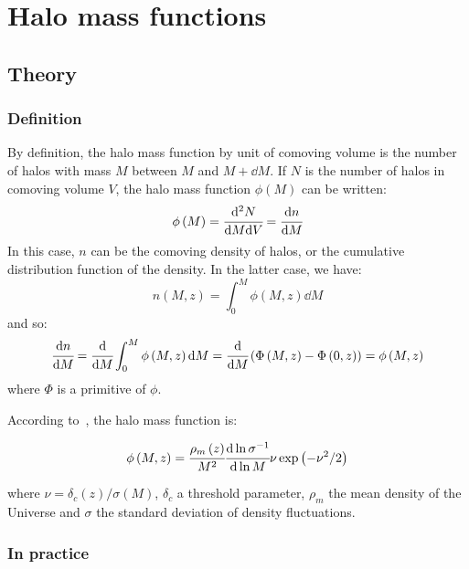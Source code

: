 \chapter{Halo mass functions}
\label{cha:halo_mass_functions}
\minitoc%

\section{Theory}

\subsection{Definition}

By definition, the halo mass function by unit of comoving volume is the number
of halos with mass $M$ between $M$ and $M+\dd{M}$. If $N$ is the number of
halos in comoving volume $V$, the halo mass function $\phi\left(M\right)$ can
be written:
%
\begin{equation}
    \phi\left(M\right)=\cfrac{{\rm{d}}^2 N}{{\rm{d}} M{\rm{d}} V}=\cfrac{{\rm{d}} n}{{\rm{d}} M}
\end{equation}
%
In this case, $n$ can be the comoving density of halos, or the cumulative
distribution function of the density. In the latter case, we have:
%
\begin{equation}
    n\left(M,z\right)=\int_0^M\phi\left(M,z\right)\dd M
\end{equation}
%
and so:
%
\begin{equation}
    \cfrac{{\rm{d}} n}{{\rm{d}} M}=\cfrac{{\rm{d}}}{{\rm{d}} M}\int_0^M\phi\left(M,z\right){\rm{d}} M=
    \cfrac{{\rm{d}}}{{\rm{d}} M}\left(\Phi\left(M,z\right)-\Phi\left(0,z\right)\right)=
    \phi\left(M,z\right)
\end{equation}
%
where $\Phi$ is a primitive of $\phi$.

According to~\cite{Press+74}, the halo mass function is:

\begin{equation}
    \phi \left(M, z\right) = \cfrac{\rho_m \left(z\right)}{M^2}
    \cfrac{{\rm{d}}\ln\sigma^{-1}}{{\rm{d}}\ln M} \nu\exp \left(-\nu^2/2\right)
\end{equation}

where $\nu=\delta_c \left(z\right) / \sigma \left(M\right)$, $\delta_c$ a
threshold parameter, $\rho_m$ the mean density of the Universe and $\sigma$ the
standard deviation of density fluctuations.

\subsection{In practice}

